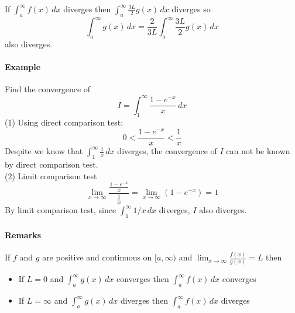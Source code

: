 \documentclass[12pt]{article}
\begin{document}
\noindent
If $\int_a^{\infty} f(x) \, dx$ diverges then $\int_a^{\infty} \frac{3L}{2} g(x) \, dx$ diverges so
\[
    \int_a^{\infty} g(x) \, dx = \frac{2}{3L} \int_a^{\infty} \frac{3L}{2} g(x) \, dx 
\]
also diverges.

\paragraph{Example} Find the convergence of 
\[
    I = \int_1^{\infty} \frac{1 - e^{ - x}}{x} \, dx 
\]
(1) Using direct comparison test:
\[
    0 < \frac{1 - e^{ - x}}{x} < \frac{1}{x} 
\]
Despite we know that $\int_1^{\infty} \frac{1}{x} \, dx$ diverges, the convergence of $I$ can not be known by direct comparison test. \\
(2) Limit comparison test
\[
    \lim_{x \to \infty} \frac{\frac{1 - e^{ - x}}{x}}{\frac{1}{x}} = \lim_{x \to \infty} (1 - e^{ - x}) = 1
\]
By limit comparison test, since $\int_1^{\infty} 1/x \, dx$ diverges, $I$ also diverges.

\paragraph{Remarks}
If $f$ and $g$ are positive and continuous on $[a, \infty)$ and $\lim_{x \to \infty} \frac{f(x)}{g(x)} = L$ then
\begin{itemize} 
    \item If $L = 0$ and $\int_a^{\infty} g(x) \, dx$ converges then $\int_a^{\infty} f(x) \, dx$ converges 
    \item If $L = \infty$ and $\int_a^{\infty} g(x) \, dx$ diverges then $\int_a^{\infty} f(x) \, dx$ diverges 
\end{itemize}
\end{document}
